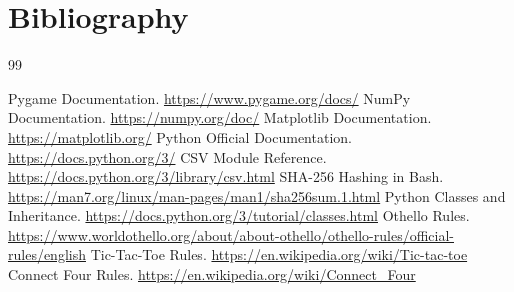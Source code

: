 \documentclass[12pt]{article}
\begin{document}



\section{Bibliography}

\begin{thebibliography}{99}

 Pygame Documentation. \url{https://www.pygame.org/docs/}
 NumPy Documentation. \url{https://numpy.org/doc/}
 Matplotlib Documentation. \url{https://matplotlib.org/}
 Python Official Documentation. \url{https://docs.python.org/3/}
 CSV Module Reference. \url{https://docs.python.org/3/library/csv.html}
 SHA-256 Hashing in Bash. \url{https://man7.org/linux/man-pages/man1/sha256sum.1.html}
 Python Classes and Inheritance. \url{https://docs.python.org/3/tutorial/classes.html}
 Othello Rules. \url{https://www.worldothello.org/about/about-othello/othello-rules/official-rules/english}
 Tic-Tac-Toe Rules. \url{https://en.wikipedia.org/wiki/Tic-tac-toe}
 Connect Four Rules. \url{https://en.wikipedia.org/wiki/Connect_Four}

\end{thebibliography}
\end{document}

